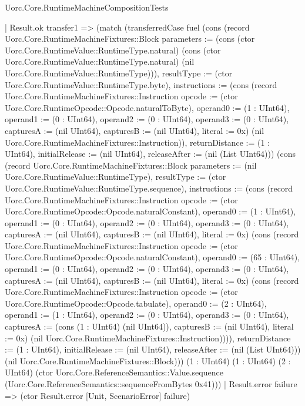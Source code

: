 \begin{lexlean}{Uorc.Core.RuntimeMachineCompositionTests}
\begin{semanticmodule}
{      | Result.ok transfer1 => (match (transferredCase fuel (cons (record Uorc.Core.RuntimeMachineFixtures::Block {parameters := (cons (ctor Uorc.Core.RuntimeValue::RuntimeType.natural) (cons (ctor Uorc.Core.RuntimeValue::RuntimeType.natural) (nil Uorc.Core.RuntimeValue::RuntimeType))), resultType := (ctor Uorc.Core.RuntimeValue::RuntimeType.byte), instructions := (cons (record Uorc.Core.RuntimeMachineFixtures::Instruction {opcode := (ctor Uorc.Core.RuntimeOpcode::Opcode.naturalToByte), operand0 := (1 : UInt64), operand1 := (0 : UInt64), operand2 := (0 : UInt64), operand3 := (0 : UInt64), capturesA := (nil UInt64), capturesB := (nil UInt64), literal := 0x}) (nil Uorc.Core.RuntimeMachineFixtures::Instruction)), returnDistance := (1 : UInt64), initialRelease := (nil UInt64), releaseAfter := (nil (List UInt64))}) (cons (record Uorc.Core.RuntimeMachineFixtures::Block {parameters := (nil Uorc.Core.RuntimeValue::RuntimeType), resultType := (ctor Uorc.Core.RuntimeValue::RuntimeType.sequence), instructions := (cons (record Uorc.Core.RuntimeMachineFixtures::Instruction {opcode := (ctor Uorc.Core.RuntimeOpcode::Opcode.naturalConstant), operand0 := (1 : UInt64), operand1 := (0 : UInt64), operand2 := (0 : UInt64), operand3 := (0 : UInt64), capturesA := (nil UInt64), capturesB := (nil UInt64), literal := 0x}) (cons (record Uorc.Core.RuntimeMachineFixtures::Instruction {opcode := (ctor Uorc.Core.RuntimeOpcode::Opcode.naturalConstant), operand0 := (65 : UInt64), operand1 := (0 : UInt64), operand2 := (0 : UInt64), operand3 := (0 : UInt64), capturesA := (nil UInt64), capturesB := (nil UInt64), literal := 0x}) (cons (record Uorc.Core.RuntimeMachineFixtures::Instruction {opcode := (ctor Uorc.Core.RuntimeOpcode::Opcode.tabulate), operand0 := (2 : UInt64), operand1 := (1 : UInt64), operand2 := (0 : UInt64), operand3 := (0 : UInt64), capturesA := (cons (1 : UInt64) (nil UInt64)), capturesB := (nil UInt64), literal := 0x}) (nil Uorc.Core.RuntimeMachineFixtures::Instruction)))), returnDistance := (1 : UInt64), initialRelease := (nil UInt64), releaseAfter := (nil (List UInt64))}) (nil Uorc.Core.RuntimeMachineFixtures::Block))) (1 : UInt64) (1 : UInt64) (2 : UInt64) (ctor Uorc.Core.ReferenceSemantics::Value.sequence (Uorc.Core.ReferenceSemantics::sequenceFromBytes 0x41)))
        | Result.error failure => (ctor Result.error [Unit, ScenarioError] failure)
}
\end{semanticmodule}
\end{lexlean}
